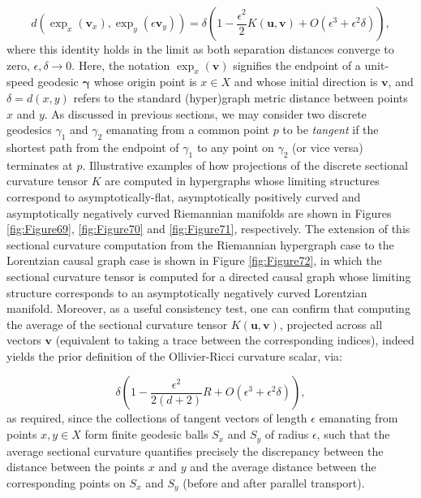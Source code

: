 \documentclass{article}
\begin{document}
\begin{equation}
d \left( \exp_x \left( \mathbf{v}_x \right), \exp_y \left( \epsilon \mathbf{v}_y \right) \right) = \delta \left( 1 - \frac{\epsilon^2}{2} K \left( \mathbf{u}, \mathbf{v} \right) + O \left( \epsilon^3 + \epsilon^2 \delta \right) \right),
\end{equation}
where this identity holds in the limit as both separation distances converge to zero, ${\epsilon, \delta \to 0}$. Here, the notation ${\exp_x \left( \mathbf{v} \right)}$ signifies the endpoint of a unit-speed geodesic ${\boldsymbol\gamma}$ whose origin point is ${x \in X}$ and whose initial direction is ${\mathbf{v}}$, and ${\delta = d \left( x, y \right)}$ refers to the standard (hyper)graph metric distance between points $x$ and $y$. As discussed in previous sections, we may consider two discrete geodesics ${\gamma_1}$ and ${\gamma_2}$ emanating from a common point $p$ to be \textit{tangent} if the shortest path from the endpoint of ${\gamma_1}$ to any point on ${\gamma_2}$ (or vice versa) terminates at $p$. Illustrative examples of how projections of the discrete sectional curvature tensor $K$ are computed in hypergraphs whose limiting structures correspond to asymptotically-flat, asymptotically positively curved and asymptotically negatively curved Riemannian manifolds are shown in Figures \ref{fig:Figure69}, \ref{fig:Figure70} and \ref{fig:Figure71}, respectively. The extension of this sectional curvature computation from the Riemannian hypergraph case to the Lorentzian causal graph case is shown in Figure \ref{fig:Figure72}, in which the sectional curvature tensor is computed for a directed causal graph whose limiting structure corresponds to an asymptotically negatively curved Lorentzian manifold. Moreover, as a useful consistency test, one can confirm that computing the average of the sectional curvature tensor ${K \left( \mathbf{u}, \mathbf{v} \right)}$, projected across all vectors ${\mathbf{v}}$ (equivalent to taking a trace between the corresponding indices), indeed yields the prior definition of the Ollivier-Ricci curvature scalar, via:

\begin{equation}
\delta \left( 1 - \frac{\epsilon^2}{2 \left( d + 2 \right)} R + O \left( \epsilon^3 + \epsilon^2 \delta \right) \right),
\end{equation}
as required, since the collections of tangent vectors of length ${\epsilon}$ emanating from points ${x, y \in X}$ form finite geodesic balls ${S_x}$ and ${S_y}$ of radius ${\epsilon}$, such that the average sectional curvature quantifies precisely the discrepancy between the distance between the points $x$ and $y$ and the average distance between the corresponding points on ${S_x}$ and ${S_y}$ (before and after parallel transport).
\end{document}
